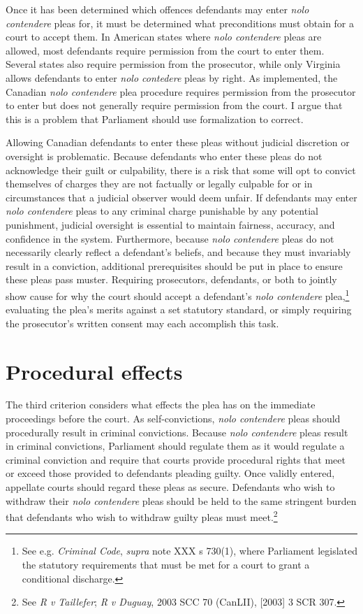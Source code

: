 Once it has been determined which offences defendants may enter \textit{nolo contendere} pleas for, it must be determined what preconditions must obtain for a court to accept them. In American states where \textit{nolo contendere} pleas are allowed, most defendants require permission from the court to enter them. Several states also require permission from the prosecutor, while only Virginia allows defendants to enter \textit{nolo contedere} pleas by right. As implemented, the Canadian \textit{nolo contendere} plea procedure requires permission from the prosecutor to enter but does not generally require permission from the court. I argue that this is a problem that Parliament should use formalization to correct.

Allowing Canadian defendants to enter these pleas without judicial discretion or oversight is problematic. Because defendants who enter these pleas do not acknowledge their guilt or culpability, there is a risk that some will opt to convict themselves of charges they are not factually or legally culpable for or in circumstances that a judicial observer would deem unfair. If defendants may enter \textit{nolo contendere} pleas to any criminal charge punishable by any potential punishment, judicial oversight is essential to maintain fairness, accuracy, and confidence in the system. Furthermore, because \textit{nolo contendere} pleas do not necessarily clearly reflect a defendant's beliefs, and because they must invariably result in a conviction, additional prerequisites should be put in place to ensure these pleas pass muster. Requiring prosecutors, defendants, or both to jointly show cause for why the court should accept a defendant's \textit{nolo contendere} plea,\footnote{See e.g. \textit{Criminal Code}, \textit{supra} note XXX s 730(1), where Parliament legislated the statutory requirements that must be met for a court to grant a conditional discharge.} evaluating the plea's merits against a set statutory standard, or simply requiring the prosecutor's written consent may each accomplish this task. 

\section{Procedural effects}

The third criterion considers what effects the plea has on the immediate proceedings before the court. As self-convictions, \textit{nolo contendere} pleas should procedurally result in criminal convictions. Because \textit{nolo contendere} pleas result in criminal convictions, Parliament should regulate them as it would regulate a criminal conviction and require that courts provide procedural rights that meet or exceed those provided to defendants pleading guilty. Once validly entered, appellate courts should regard these pleas as secure. Defendants who wish to withdraw their \textit{nolo contendere} pleas should be held to the same stringent burden that defendants who wish to withdraw guilty pleas must meet.\footnote{See \textit{R v Taillefer}; \textit{R v Duguay}, 2003 SCC 70 (CanLII), [2003] 3 SCR 307.}


